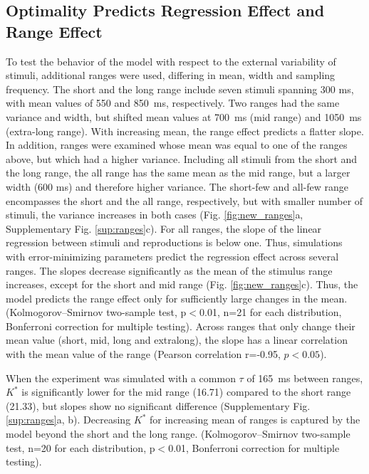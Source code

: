 \documentclass[10pt]{article}
\begin{document}
\subsection{Optimality Predicts Regression Effect and Range Effect}
To test the behavior of the model with respect to the external variability of stimuli, additional ranges were used, differing in mean, width and sampling frequency.
The short and the long range include seven stimuli spanning 300 ms, with mean values of 550 and 850~ms, respectively. 
Two ranges had the same variance and width, but shifted mean values at 700~ms (mid range) and 1050~ms (extra-long range). With increasing mean, the range effect predicts a flatter slope. 
In addition, ranges were examined whose mean was equal to one of the ranges above, but which had a higher variance.
Including all stimuli from the short and the long range, the all range has the same mean as the mid range, but a larger width (600 ms) and therefore higher variance.
The short-few and all-few range encompasses the short and the all range, respectively, but with smaller number of stimuli, the variance increases in both cases 
(Fig. \ref{fig:new_ranges}a, Supplementary Fig. \ref{sup:ranges}c).
For all ranges, the slope of the linear regression between stimuli and reproductions is below one. Thus, simulations with error-minimizing parameters predict the regression effect across several ranges. 
The slopes decrease significantly as the mean of the stimulus range increases, except for the short and mid range (Fig. \ref{fig:new_ranges}c).
Thus, the model predicts the range effect only for sufficiently large changes in the mean. 
(Kolmogorov–Smirnov  two-sample test, p$<$0.01, n=21 for each distribution, Bonferroni correction for multiple testing).
Across ranges that only change their mean value (short, mid, long and extralong), the slope has a linear correlation with the mean value of the range (Pearson correlation r=-0.95, $p<0.05$).

When the experiment was simulated with a common $\tau$ of 165~ms between ranges, $K^*$ is significantly lower for the mid range (16.71) compared to the short range (21.33), but slopes show no significant difference (Supplementary Fig. \ref{sup:ranges}a, b).
Decreasing $K^*$ for increasing mean of ranges is captured by the model beyond the short and the long range.
(Kolmogorov–Smirnov two-sample test, n=20 for each distribution, p$<$0.01, Bonferroni correction for multiple testing).\\
\end{document}
